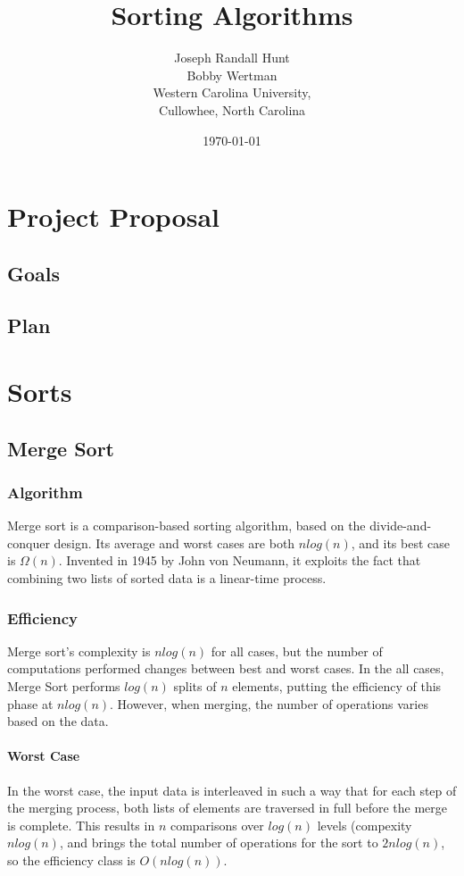 \documentclass{article}
\title{Sorting Algorithms}
\author{Joseph Randall Hunt\\
Bobby Wertman\\
Western Carolina University,\\
Cullowhee, North Carolina\\
}
\date{\today}
\begin{document}
\maketitle
\section{Project Proposal}
   \subsection{Goals}
   \subsection{Plan}
\section{Sorts}
   \subsection{Merge Sort}
      \subsubsection{Algorithm}
        Merge sort is a comparison-based sorting algorithm, based on the
        divide-and-conquer design.  Its average and worst cases are both $n
        log(n)$, and its best case is $\Omega(n)$.  Invented in 1945 by John
        von Neumann, it exploits the fact that combining two lists of sorted
        data is a linear-time process.  \cite{introalg}
      \subsubsection{Efficiency}
        Merge sort's complexity is $n log(n)$ for all cases, but the number of
        computations performed changes between best and worst cases.  In the
        all cases, Merge Sort performs $log(n)$ splits of $n$ elements, putting
        the efficiency of this phase at $n log(n)$.  However, when merging, the
        number of operations varies based on the data.
        \paragraph{Worst Case}
          In the worst case, the input data is interleaved in such a way that
          for each step of the merging process, both lists of elements are
          traversed in full before the merge is complete.  This results in $n$
          comparisons over $log(n)$ levels (compexity $n log(n)$, and brings
          the total number of operations for the sort to $2n log(n)$, so the
          efficiency class is $O(n log(n))$.
\end{document}
